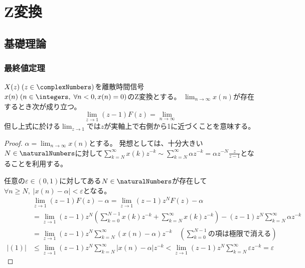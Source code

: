\part{Z変換}
	\chapter{基礎理論}
		\section{最終値定理}
			\begin{shadebox}
				$X(z)\;(z\in\complexNumbers)$を離散時間信号$x(n)\;(n \in \integers,\;\forall n<0,x(n)=0)$のZ変換とする。
				$\lim_{n\to\infty} x(n)$が存在するとき次が成り立つ。
				\[ \lim_{z\to1}(z-1)F(z) = \lim_{n\to\infty} \]
				但し上式に於ける$\lim_{z\to1}$では$z$が実軸上で右側から1に近づくことを意味する。
			\end{shadebox}
			\begin{proof}
				\quad\par
				$\alpha = \lim_{n\to\infty} x(n)$とする。
				発想としては、十分大きい$N\in\naturalNumbers$に対して$\sum_{k=N}^\infty x(k)z^{-k} \sim \sum_{k=N}^\infty \alpha z^{-k} = \alpha z^{-N}\frac{z}{z-1}$となることを利用する。
				\par
				任意の$\varepsilon \in (0,1)$に対してある$N\in\naturalNumbers$が存在して$\forall n\geq N,\;|x(n)-\alpha|<\varepsilon$となる。
				\begin{align}
					\quad &\lim_{z\to1}(z-1)F(z) - \alpha = \lim_{z\to1}(z-1)z^N F(z) - \alpha \nonumber \\
					&= \lim_{z\to1}(z-1)z^N\left(\sum_{k=0}^{N-1} x(k)z^{-k} + \sum_{k=N}^\infty x(k)z^{-k}\right) - (z-1)z^N\sum_{k=N}^\infty \alpha z^{-k} \nonumber \\
					&= \lim_{z\to1}(z-1)z^N \sum_{k=N}^\infty (x(n) - \alpha)z^{-k} \quad \left(\sum_{k=0}^{N-1}\text{の項は極限で消える}\right) \\
					|(1)| &\leq \lim_{z\to1}(z-1)z^N \sum_{k=N}^\infty |x(n) - \alpha|z^{-k} < \lim_{z\to1}(z-1)z^N \sum_{k=N}^\infty \varepsilon z^{-k} = \varepsilon \nonumber
				\end{align}
			\end{proof}
